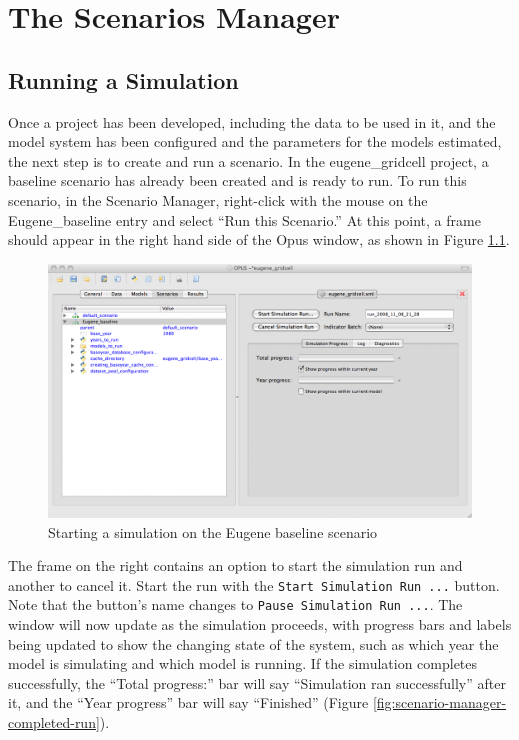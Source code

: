 \chapter{The Scenarios Manager}
\label{chap:scenarios-manager}

\section{Running a Simulation}

Once a project has been developed, including the data to be used in it, and
the model system has been configured and the parameters for the models
estimated, the next step is to create and run a scenario.  In the
eugene\_gridcell project, a baseline scenario has already been created and
is ready to run.  To run this scenario, in the Scenario Manager,
right-click with the mouse on the Eugene\_baseline entry and select
``Run this Scenario.''  At this point, a frame should appear in the
right hand side of the Opus window, as shown in Figure
\ref{fig:scenario-manager-start-run}.

\begin{figure}[htp]
\begin{center}
\includegraphics[scale=0.4]{part-gui/images/scenario-manager-start-run.png}
\end{center}
\caption{Starting a simulation on the Eugene baseline scenario}
\label{fig:scenario-manager-start-run}
\end{figure}

The frame on the right contains an option to start the simulation run and
another to cancel it.  Start the run with the
\verb#Start Simulation Run ...# button.  Note that the button's name
changes to \verb#Pause Simulation Run ...#.  The window will now update as
the simulation proceeds, with progress bars and labels being updated to
show the changing state of the system, such as which year the model is
simulating and which model is running.  If the simulation completes
successfully, the ``Total progress:'' bar will say ``Simulation ran
successfully'' after it, and the ``Year progress'' bar will say
``Finished'' (Figure \ref{fig:scenario-manager-completed-run}).


